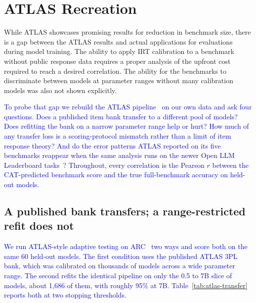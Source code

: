 \providecommand{\aiadd}[1]{\textcolor{blue}{#1}}
\providecommand{\aibullets}[1]{{\color{blue}#1}}

\section{ATLAS Recreation}
\label{sec:mcq-atlas-recreation}

While ATLAS showcases promising results for reduction in benchmark size, there is
a gap between the ATLAS results and actual applications for evaluations during
model training. The ability to apply IRT calibration to a benchmark without public
response data requires a proper analysis of the upfront cost required to reach a
desired correlation. The ability for the benchmarks to discriminate between models
at parameter ranges without many calibration models was also not shown explicitly.

\aiadd{To probe that gap we rebuild the ATLAS pipeline~\cite{li2026adaptive} on
our own data and ask four questions. Does a published item bank transfer to a
different pool of models? Does refitting the bank on a narrow parameter range help
or hurt? How much of any transfer loss is a scoring-protocol mismatch rather than
a limit of item response theory? And do the error patterns ATLAS reported on its
five benchmarks reappear when the same analysis runs on the newer Open LLM
Leaderboard tasks~\cite{fourrier2024openllm}? Throughout, every correlation is the
Pearson $r$ between the CAT-predicted benchmark score and the true full-benchmark
accuracy on held-out models.}

\subsection{A published bank transfers; a range-restricted refit does not}
\label{subsec:atlas-transfer}

\aiadd{We run ATLAS-style adaptive testing on ARC~\cite{clark2018arc} two ways and
score both on the same 60 held-out models. The first condition uses the published
ATLAS 3PL bank, which was calibrated on thousands of models across a wide parameter
range. The second refits the identical pipeline on only the 0.5 to 7B slice of
models, about 1{,}686 of them, with roughly 95\% at 7B. Table~\ref{tab:atlas-transfer}
reports both at two stopping thresholds.}

